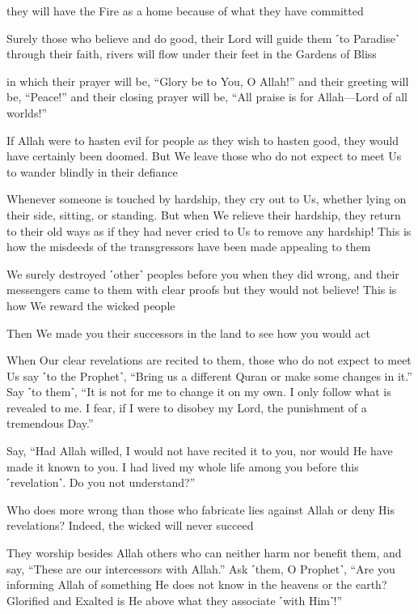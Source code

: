 they will have the Fire as a home because of what they have committed

Surely those who believe and do good, their Lord will guide them ˹to Paradise˺ through their faith, rivers will flow under their feet in the Gardens of Bliss

in which their prayer will be, “Glory be to You, O Allah!” and their greeting will be, “Peace!” and their closing prayer will be, “All praise is for Allah—Lord of all worlds!”

If Allah were to hasten evil for people as they wish to hasten good, they would have certainly been doomed. But We leave those who do not expect to meet Us to wander blindly in their defiance

Whenever someone is touched by hardship, they cry out to Us, whether lying on their side, sitting, or standing. But when We relieve their hardship, they return to their old ways as if they had never cried to Us to remove any hardship! This is how the misdeeds of the transgressors have been made appealing to them

We surely destroyed ˹other˺ peoples before you when they did wrong, and their messengers came to them with clear proofs but they would not believe! This is how We reward the wicked people

Then We made you their successors in the land to see how you would act

When Our clear revelations are recited to them, those who do not expect to meet Us say ˹to the Prophet˺, “Bring us a different Quran or make some changes in it.” Say ˹to them˺, “It is not for me to change it on my own. I only follow what is revealed to me. I fear, if I were to disobey my Lord, the punishment of a tremendous Day.”

Say, “Had Allah willed, I would not have recited it to you, nor would He have made it known to you. I had lived my whole life among you before this ˹revelation˺. Do you not understand?”

Who does more wrong than those who fabricate lies against Allah or deny His revelations? Indeed, the wicked will never succeed

They worship besides Allah others who can neither harm nor benefit them, and say, “These are our intercessors with Allah.” Ask ˹them, O Prophet˺, “Are you informing Allah of something He does not know in the heavens or the earth? Glorified and Exalted is He above what they associate ˹with Him˺!”

